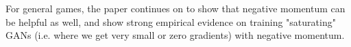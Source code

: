 \documentclass{article}
\begin{document}
For general games, the paper continues on to show that negative momentum can be helpful as well, and show strong empirical evidence on training "saturating" GANs (i.e. where we get very small or zero gradients) with negative momentum.

 







\end{document}
